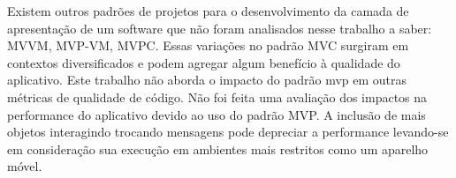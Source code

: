 Existem outros padrões de projetos para o desenvolvimento da camada de
apresentação de um software que não foram analisados nesse trabalho a saber: 
MVVM, MVP-VM, MVPC. Essas variações no padrão MVC surgiram em contextos
diversificados e podem agregar algum benefício à qualidade do aplicativo.
Este trabalho não aborda o impacto do padrão mvp em outras métricas de qualidade
de código.
Não foi feita uma avaliação dos impactos na performance do aplicativo devido ao
uso do padrão MVP. A inclusão de mais objetos interagindo trocando mensagens
pode depreciar a performance levando-se em consideração sua execução em
ambientes mais restritos como um aparelho móvel.
